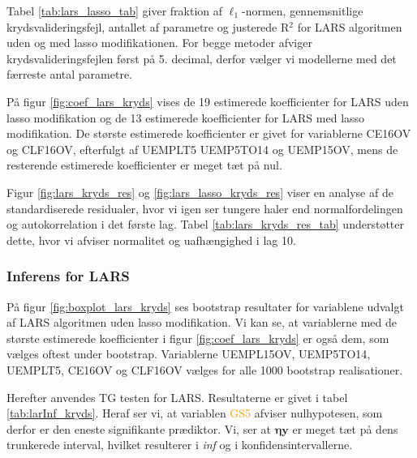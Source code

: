 
Tabel \ref{tab:lars_lasso_tab} giver fraktion af \(\ell_1\)-normen, gennemsnitlige krydsvalideringsfejl, antallet af parametre og justerede R$^2$ for LARS algoritmen uden og med lasso modifikationen. 
For begge metoder afviger krydsvalideringsfejlen først på 5. decimal, derfor vælger vi modellerne med det færreste antal parametre. 
%

%
På figur \ref{fig:coef_lars_kryds} vises de 19 estimerede koefficienter for LARS uden lasso modifikation og de 13 estimerede koefficienter for LARS med lasso modifikation. 
De største estimerede koefficienter er givet for variablerne \textcolor{blue3}{CE16OV} og \textcolor{blue3}{CLF16OV}, efterfulgt af \textcolor{blue3}{UEMPLT5} \textcolor{blue3}{UEMP5TO14} og \textcolor{blue3}{UEMP15OV}, mens de resterende estimerede koefficienter er meget tæt på nul. 


Figur \ref{fig:lars_kryds_res} og \ref{fig:lars_lasso_kryds_res} viser en analyse af de standardiserede residualer, hvor vi igen ser tungere haler end normalfordelingen og autokorrelation i det første lag. 
Tabel \ref{tab:lars_kryds_res_tab} understøtter dette, hvor vi afviser normalitet og uafhængighed i lag 10. 

\newpage
\subsubsection{Inferens for LARS}
På figur \ref{fig:boxplot_lars_kryds} ses bootstrap resultater for variablene udvalgt af LARS algoritmen uden lasso modifikation. 
Vi kan se, at variablerne med de største estimerede koefficienter i figur \ref{fig:coef_lars_kryds} er også dem, som vælges oftest under bootstrap. 
Variablerne \textcolor{blue3}{UEMPL15OV}, \textcolor{blue3}{UEMP5TO14}, \textcolor{blue3}{UEMPLT5}, \textcolor{blue3}{CE16OV} og \textcolor{blue3}{CLF16OV} vælges for alle 1000 bootstrap realisationer.


Herefter anvendes TG testen for LARS.
Resultaterne er givet i tabel \ref{tab:larInf_kryds}.
Heraf ser vi, at variablen \textcolor{orange}{GS5} afviser nulhypotesen, som derfor er den eneste signifikante prædiktor. 
Vi, ser at $\boldsymbol{\eta} \textbf{y}$ er meget tæt på dens trunkerede interval, hvilket resulterer i \textit{inf} og  i konfidensintervallerne.  


